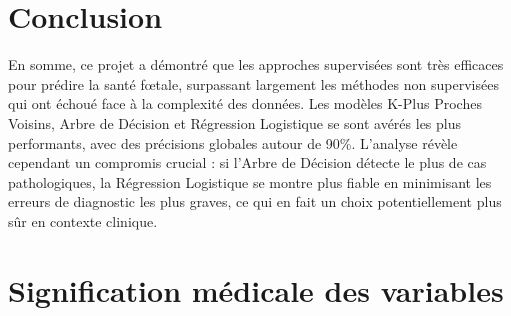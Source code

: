 \documentclass[twocolumn,10pt]{article}
\begin{document}




\section{Conclusion}\label{sec:sup}

En somme, ce projet a démontré que les approches supervisées sont très efficaces pour prédire la santé fœtale, surpassant largement les méthodes non supervisées qui ont échoué face à la complexité des données. Les modèles K-Plus Proches Voisins, Arbre de Décision et Régression Logistique se sont avérés les plus performants, avec des précisions globales autour de 90\%. L'analyse révèle cependant un compromis crucial : si l'Arbre de Décision détecte le plus de cas pathologiques, la Régression Logistique se montre plus fiable en minimisant les erreurs de diagnostic les plus graves, ce qui en fait un choix potentiellement plus sûr en contexte clinique. 




\appendix
\section{Signification médicale des variables}
\end{document}
